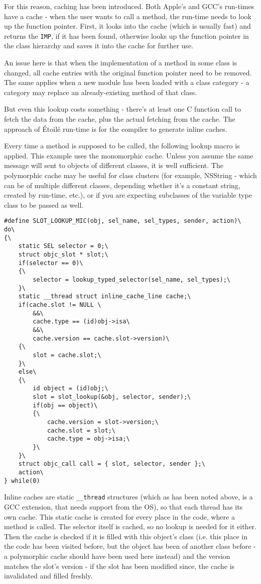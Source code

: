 For this reason, caching has been introduced. Both Apple's and GCC's run-times have a cache - when the user wants to call a method, the run-time needs to look up the function pointer. First, it looks into the cache (which is usually fast) and returns the \verb=IMP=, if it has been found, otherwise looks up the function pointer in the class hierarchy and saves it into the cache for further use.

An issue here is that when the implementation of a method in some class is changed, all cache entries with the original function pointer need to be removed. The same applies when a new module has been loaded with a class category - a category may replace an already-existing method of that class.

But even this lookup costs something - there's at least one C function call to fetch the data from the cache, plus the actual fetching from the cache. The approach of \'Etoil\'e run-time is for the compiler to generate inline caches.

Every time a method is supposed to be called, the following lookup macro is applied. This example uses the monomorphic cache. Unless you assume the same message will sent to objects of different classes, it is well sufficient. The polymorphic cache may be useful for class clusters (for example, NSString - which can be of multiple different classes, depending whether it's a constant string, created by run-time, etc.), or if you are expecting subclasses of the variable type class to be passed as well.

\begin{verbatim}
#define SLOT_LOOKUP_MIC(obj, sel_name, sel_types, sender, action)\
do\
{\
    static SEL selector = 0;\
    struct objc_slot * slot;\
    if(selector == 0)\
    {\
        selector = lookup_typed_selector(sel_name, sel_types);\
    }\
    static __thread struct inline_cache_line cache;\
    if(cache.slot != NULL \
        &&\
        cache.type == (id)obj->isa\
        &&\
        cache.version == cache.slot->version)\
    {\
        slot = cache.slot;\
    }\
    else\
    {\
        id object = (id)obj;\
        slot = slot_lookup(&obj, selector, sender);\
        if(obj == object)\
        {\
            cache.version = slot->version;\
            cache.slot = slot;\
            cache.type = obj->isa;\
        }\
    }\
    struct objc_call call = { slot, selector, sender };\
    action\
} while(0)
\end{verbatim}


Inline caches are static \verb=__thread= structures (which as has been noted above, is a GCC extension, that needs support from the OS), so that each thread has its own cache. This static cache is created for every place in the code, where a method is called. The selector itself is cached, so no lookup is needed for it either. Then the cache is checked if it is filled with this object's class (i.e. this place in the code has been visited before, but the object has been of another class before - a polymorphic cache should have been used here instead) and the version matches the slot's version - if the slot has been modified since, the cache is invalidated and filled freshly.

